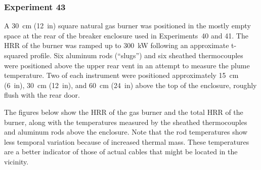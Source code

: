 \clearpage

\subsubsection{Experiment 43}

A 30~cm (12~in) square natural gas burner was positioned in the mostly empty space at the rear of the breaker enclosure used in Experiments~40 and 41. The HRR of the burner was ramped up to 300~kW following an approximate t-squared profile. Six aluminum rods (``slugs'') and six sheathed thermocouples were positioned above the upper rear vent in an attempt to measure the plume temperature. Two of each instrument were positioned approximately 15~cm (6~in), 30~cm (12~in), and 60~cm (24~in) above the top of the enclosure, roughly flush with the rear door.

The figures below show the HRR of the gas burner and the total HRR of the burner, along with the temperatures measured by the sheathed thermocouples and aluminum rods above the enclosure. Note that the rod temperatures show less temporal variation because of increased thermal mass. These temperatures are a better indicator of those of actual cables that might be located in the vicinity.

